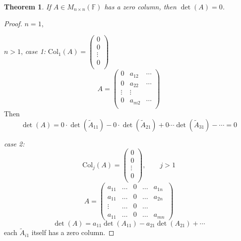 \documentclass[12pt]{article}
\theoremstyle{plain}
\newtheorem{theorem}{Theorem}[subsection]
\newcommand{\Col}{\mathrm{Col}}
\newcommand{\mF}{{\mathbb{F}}}
\begin{document}
\begin{theorem}
	If $A \in M_{n\times n} (\mF)$ has a zero column, then $\det(A) = 0$.
\end{theorem}
\begin{proof}
	$n = 1$,

	$n>1$, \textit{case 1: } $\Col_1(A) = 
	\begin{pmatrix}
		0	\\
		0	\\
		\vdots	\\
		0	\\
	\end{pmatrix}$
	\[
		A = 
		\begin{pmatrix}
			0 & a_{12} & \cdots		\\
			0 & a_{22} & \cdots		\\
			\vdots & \vdots		\\
			0 & a_{m2} & \cdots		\\
		\end{pmatrix}
	\]
	Then 
	\[
		\det(A) = 0\cdot \det(\tilde A_{11}) - 0\cdot \det(\tilde A_{21})
		+ 0\cdots \det(\tilde A_{31}) - \cdots
		= 0
	\]

	\textit{case 2:} 
	\[
		\Col_j(A) = \begin{pmatrix}
		0	\\
		0	\\
		\vdots	\\
		0	\\
	\end{pmatrix}, \qquad j > 1
	\]
	\[
		A = 
		\begin{pmatrix}
			a_{11}  & \ldots & 0 & \ldots & a_{1n}	\\
			a_{11}  & \ldots & 0 & \ldots & a_{2n}	\\
			\vdots  & \ldots & 0 & \ldots &			\\
			a_{11}  & \ldots & 0 & \ldots & a_{mn}	
		\end{pmatrix}
	\]
	\[
		\det(A) = a_{11} \det(A_{11}) - a_{21} \det(A_{21}) + \cdots
	\]
	each $\tilde A_{i1}$ itself has a zero column. 
\end{proof}





\newpage
\end{document}
